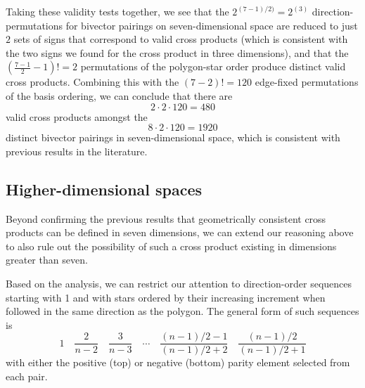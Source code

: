 \documentclass[11pt]{article}
\begin{document}
Taking these validity tests together, we see that the $2^{(7-1)/2)} = 2^(3)$  direction-permutations for bivector pairings on seven-dimensional space are reduced to just $2$ sets of signs that correspond to valid cross products (which is consistent with the two signs we found for the cross product in three dimensions), and that the $(\frac{7-1}{2} -1)! = 2$ permutations of the polygon-star order produce distinct valid cross products. Combining this with the $(7-2)! = 120 $ edge-fixed permutations of the basis ordering, we can conclude that there are
\begin{equation}
2 \cdot 2 \cdot 120 = 480
\end{equation}
valid cross products amongst the 
\begin{equation}
8 \cdot 2 \cdot 120 = 1920
\end{equation}
distinct bivector pairings in seven-dimensional space, which is consistent with previous results in the literature.

\subsection{Higher-dimensional spaces}

Beyond confirming the previous results that geometrically consistent cross products can be defined in seven dimensions, we can extend our reasoning above to also rule out the possibility of such a cross product existing in dimensions greater than seven.

Based on the  analysis, we can restrict our attention to direction-order sequences starting with 1 and with stars ordered by their increasing increment when followed in the same direction as the polygon. The general form of such sequences is
%
\begin{equation}
1\hspace{1em}\frac{2}{n-2} \hspace{1em} \frac{3}{n-3}\hspace{1em} \cdots \hspace{1em} \frac{(n-1)/2 -1}{(n-1)/2 +2} \hspace{1em} \frac{(n-1)/2}{(n-1)/2 +1}
\end{equation}
with either the positive (top) or negative (bottom) parity element selected from each pair.
\end{document}
